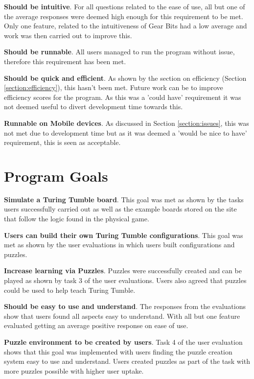 \documentclass{l4proj}
\begin{document}
\textbf{Should be intuitive}. For all questions related to the ease of use, all but one of the average responses were deemed high enough for this requirement to be met. Only one feature, related to the intuitiveness of Gear Bits had a low average and work was then carried out to improve this. 

\textbf{Should be runnable}. All users managed to run the program without issue, therefore this requirement has been met.

\textbf{Should be quick and efficient}. As shown by the section on efficiency (Section \ref{section:efficiency}), this hasn't been met. Future work can be to improve efficiency scores for the program. As this was a 'could have' requirement it was not deemed useful to divert development time towards this. 

\textbf{Runnable on Mobile devices}. As discussed in Section \ref{section:issues}, this was not met due to development time but as it was deemed a 'would be nice to have' requirement, this is seen as acceptable. 

\section{Program Goals}

\textbf{Simulate a Turing Tumble board}. This goal was met as shown by the tasks users successfully carried out as well as the example boards stored on the site that follow the logic found in the physical game.

\textbf{Users can build their own Turing Tumble configurations}. This goal was met as shown by the user evaluations in which users built configurations and puzzles.

\textbf{Increase learning via Puzzles}. Puzzles were successfully created and can be played as shown by task 3 of the user evaluations. Users also agreed that puzzles could be used to help teach Turing Tumble.

\textbf{Should be easy to use and understand}. The responses from the evaluations show that users found all aspects easy to understand. With all but one feature evaluated getting an average positive response on ease of use. 

\textbf{Puzzle environment to be created by users}. Task 4 of the user evaluation shows that this goal was implemented with users finding the puzzle creation system easy to use and understand. Users created puzzles as part of the task with more puzzles possible with higher user uptake. 
\end{document}
